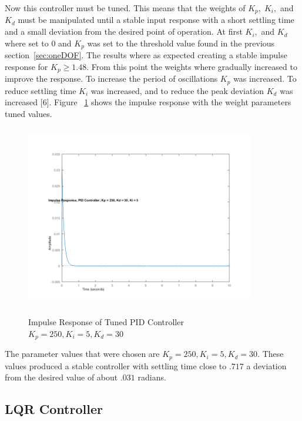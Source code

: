 \documentclass[12pt]{article} %
\begin{document}
Now this controller must be tuned. This means that the weights of $K_p, \; K_i,$ and $K_d$ must be manipulated until a stable input response with a short settling time and a small deviation from the desired point of operation. At first $K_i,$ and $K_d$ where set to 0 and $K_p$ was set to the threshold value found in the previous section~\ref{sec:oneDOF}. The results where as expected creating a stable impulse response for $K_p \geq 1.48$. From this point the weights where gradually increased to improve the response. To increase the period of oscillations $K_p$ was increased. To reduce settling time $K_i$ was increased, and to reduce the peak deviation $K_d$ was increased [6]. Figure ~\ref{fig:impulse_tuned} shows the impulse response with the weight parameters tuned values.
 
\begin{figure}[h] 
\caption{Impulse Response of Tuned PID Controller $K_p = 250, K_i = 5, K_d = 30$}
\includegraphics[height=8cm, width = 10cm]{impulsePID.png}
\label{fig:impulse_tuned}
\centering
\end{figure}
The parameter values that were chosen are $K_p = 250, K_i = 5, K_d = 30$. These values produced a stable controller with settling time close to $.717$ a deviation from the desired value of about $.031$ radians.

\subsection{LQR Controller}
\end{document}
